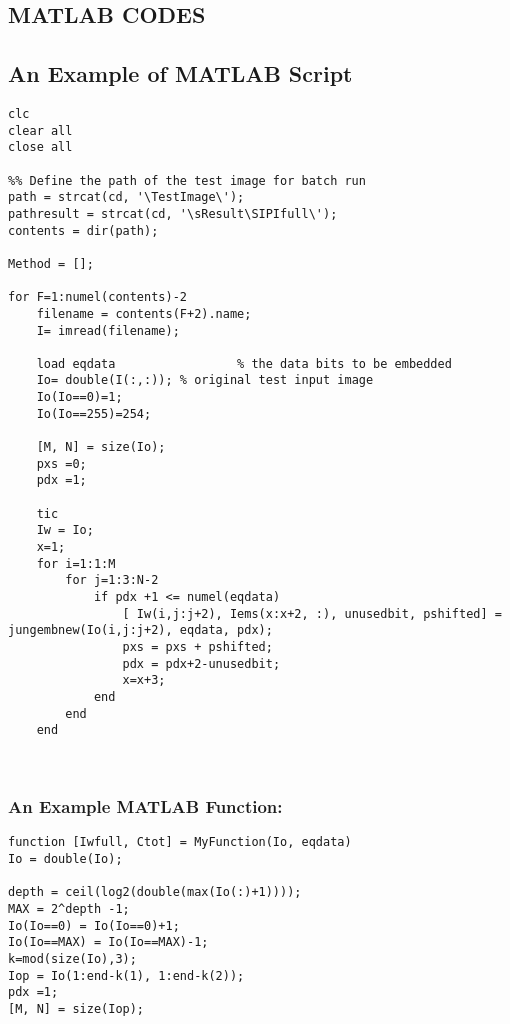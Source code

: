 
\begin{appendices}
\raggedbottom

\chapter{MATLAB CODES}
\label{matlab}
\section{An Example of MATLAB Script}

\begin{lstlisting}
clc
clear all
close all

%% Define the path of the test image for batch run
path = strcat(cd, '\TestImage\');
pathresult = strcat(cd, '\sResult\SIPIfull\');
contents = dir(path); 

Method = [];

for F=1:numel(contents)-2
    filename = contents(F+2).name;
    I= imread(filename);
  
    load eqdata  				% the data bits to be embedded
    Io= double(I(:,:)); % original test input image
    Io(Io==0)=1;
    Io(Io==255)=254;
    
    [M, N] = size(Io);
    pxs =0;
    pdx =1;
    
    tic
    Iw = Io;
    x=1;
    for i=1:1:M
        for j=1:3:N-2
            if pdx +1 <= numel(eqdata)
                [ Iw(i,j:j+2), Iems(x:x+2, :), unusedbit, pshifted] = jungembnew(Io(i,j:j+2), eqdata, pdx);
                pxs = pxs + pshifted;
                pdx = pdx+2-unusedbit;
                x=x+3;
            end
        end
    end
    
          

\end{lstlisting}

\vspace{2.5ex}
\subsection{An Example MATLAB Function: }


\begin{lstlisting}
function [Iwfull, Ctot] = MyFunction(Io, eqdata)
Io = double(Io);

depth = ceil(log2(double(max(Io(:)+1))));
MAX = 2^depth -1;
Io(Io==0) = Io(Io==0)+1;
Io(Io==MAX) = Io(Io==MAX)-1;
k=mod(size(Io),3);
Iop = Io(1:end-k(1), 1:end-k(2));
pdx =1;
[M, N] = size(Iop);


\end{lstlisting}
\end{appendices}
